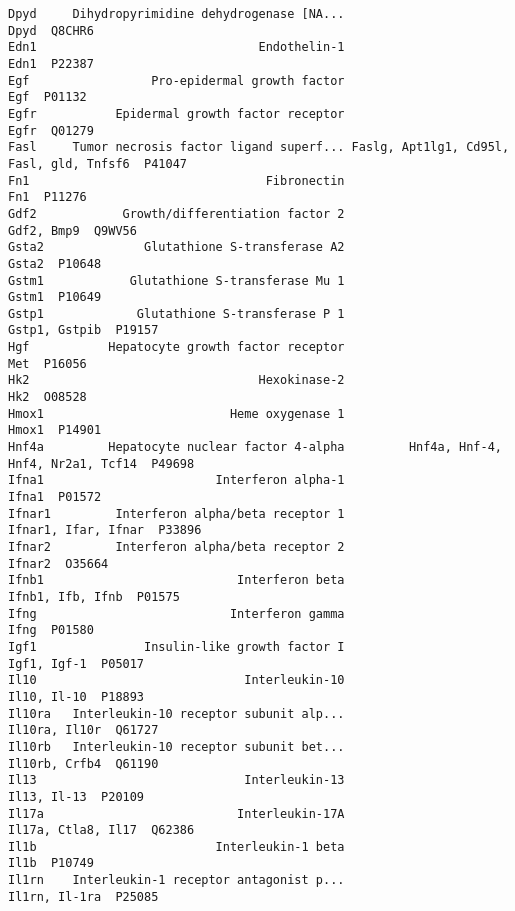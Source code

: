 \documentclass[]{article}
\begin{document}
\begin{verbatim}
Dpyd     Dihydropyrimidine dehydrogenase [NA...                                     Dpyd  Q8CHR6
Edn1                               Endothelin-1                                     Edn1  P22387
Egf                 Pro-epidermal growth factor                                      Egf  P01132
Egfr           Epidermal growth factor receptor                                     Egfr  Q01279
Fasl     Tumor necrosis factor ligand superf... Faslg, Apt1lg1, Cd95l, Fasl, gld, Tnfsf6  P41047
Fn1                                 Fibronectin                                      Fn1  P11276
Gdf2            Growth/differentiation factor 2                               Gdf2, Bmp9  Q9WV56
Gsta2              Glutathione S-transferase A2                                    Gsta2  P10648
Gstm1            Glutathione S-transferase Mu 1                                    Gstm1  P10649
Gstp1             Glutathione S-transferase P 1                            Gstp1, Gstpib  P19157
Hgf           Hepatocyte growth factor receptor                                      Met  P16056
Hk2                                Hexokinase-2                                      Hk2  O08528
Hmox1                          Heme oxygenase 1                                    Hmox1  P14901
Hnf4a         Hepatocyte nuclear factor 4-alpha         Hnf4a, Hnf-4, Hnf4, Nr2a1, Tcf14  P49698
Ifna1                        Interferon alpha-1                                    Ifna1  P01572
Ifnar1         Interferon alpha/beta receptor 1                      Ifnar1, Ifar, Ifnar  P33896
Ifnar2         Interferon alpha/beta receptor 2                                   Ifnar2  O35664
Ifnb1                           Interferon beta                         Ifnb1, Ifb, Ifnb  P01575
Ifng                           Interferon gamma                                     Ifng  P01580
Igf1               Insulin-like growth factor I                              Igf1, Igf-1  P05017
Il10                             Interleukin-10                              Il10, Il-10  P18893
Il10ra   Interleukin-10 receptor subunit alp...                            Il10ra, Il10r  Q61727
Il10rb   Interleukin-10 receptor subunit bet...                            Il10rb, Crfb4  Q61190
Il13                             Interleukin-13                              Il13, Il-13  P20109
Il17a                           Interleukin-17A                       Il17a, Ctla8, Il17  Q62386
Il1b                         Interleukin-1 beta                                     Il1b  P10749
Il1rn    Interleukin-1 receptor antagonist p...                            Il1rn, Il-1ra  P25085

\end{verbatim}
\end{document}
